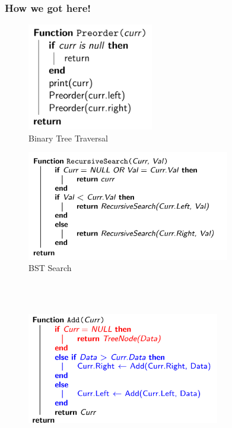 \documentclass{beamer}
\begin{document}
\begin{frame}[fragile]
    \frametitle{How we got here!}

    \begin{minipage}{0.49\textwidth}
        \centering
        \begin{figure}
            \includegraphics[width=0.49\textwidth]{./imgs/preorder.png}
            \caption{\scriptsize Binary Tree Traversal}
        \end{figure}
        \vspace{-0.5cm}
    \end{minipage}
    \vline
    \begin{minipage}{0.49\textwidth}
        \centering
        \begin{figure}
            \includegraphics[width=0.79\textwidth]{./imgs/bstsearch.png}
            \caption{\scriptsize BST Search}
        \end{figure}
    \end{minipage}
    \\
    \hline
    \\
    \begin{minipage}{0.49\textwidth}
        \centering
        \begin{figure}
            \includegraphics[width=0.75\textwidth]{./imgs/bstadd.png}

\end{figure}
\end{minipage}
\end{frame}
\end{document}
